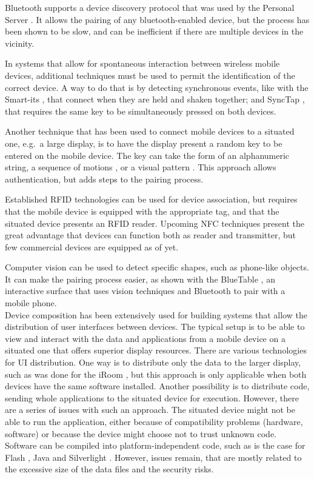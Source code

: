 Bluetooth \citeyearpar{bluetooth} supports a device discovery protocol that was used by the Personal Server \citep{Want:2002:personalserver}.
It allows the pairing of any bluetooth-enabled device, but the process has been shown to be slow, and can be inefficient if there are multiple devices in the vicinity.

In systems that allow for spontaneous interaction between wireless mobile devices, additional techniques must be used to permit the identification of the correct device.
A way to do that is by detecting synchronous events, like with the Smart-its \citep{Holmquist:2001:smartits}, that connect when they are held and shaken together; and SyncTap \citep{Rekimoto:2003:synctap}, that requires the same key to be simultaneously pressed on both devices.

Another technique that has been used to connect mobile devices to a situated one, e.g.\ a large display, is to have the display present a random key to be entered on the mobile device.
The key can take the form of an alphanumeric string, a sequence of motions \citep{Patel:2004:mobileauth}, or a visual pattern \citep{Ballagas:2005:sweeppointshoot, Scott:2005:visualauth}.
This approach allows authentication, but adds steps to the pairing process.

Established RFID technologies can be used for device association, but requires that the mobile device is equipped with the appropriate tag, and that the situated device presents an RFID reader.
Upcoming NFC techniques present the great advantage that devices can function both as reader and transmitter, but few commercial devices are equipped as of yet.

Computer vision can be used to detect specific shapes, such as phone-like objects.
It can make the pairing process easier, as shown with the BlueTable \citep{Wilson:2007:bluetable}, an interactive surface that uses vision techniques and Bluetooth to pair with a mobile phone.
\\
\linebreak
Device composition has been extensively used for building systems that allow the distribution of user interfaces between devices.
The typical setup is to be able to view and interact with the data and applications from a mobile device on a situated one that offers superior display resources.
There are various technologies for UI distribution.
One way is to distribute only the data to the larger display, such as was done for the iRoom \citep{Johanson:2002:iroom}, but this approach is only applicable when both devices have the same software installed.
Another possibility is to distribute code, sending whole applications to the situated device for execution.
However, there are a series of issues with such an approach.
The situated device might not be able to run the application, either because of compatibility problems (hardware, software) or because the device might choose not to trust unknown code.
Software can be compiled into platform-independent code, such as is the case for Flash \citep{flash}, Java \citep{java} and Silverlight \citep{silverlight}.
However, issues remain, that are mostly related to the excessive size of the data files and the security risks.

